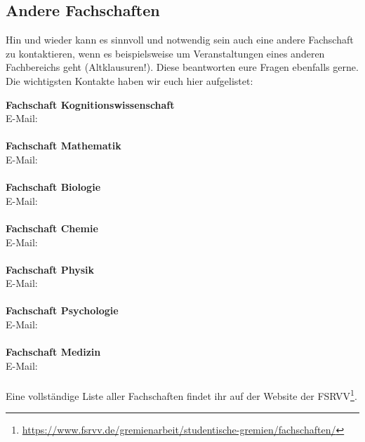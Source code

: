 

\vfill
\subsection{Andere Fachschaften}
Hin und wieder kann es sinnvoll und notwendig sein auch eine andere Fachschaft
zu kontaktieren, wenn es beispielsweise um Veranstaltungen eines anderen
Fachbereichs geht (Altklausuren!). Diese beantworten eure Fragen ebenfalls
gerne. Die wichtigsten Kontakte haben wir euch hier aufgelistet:

\textbf{Fachschaft Kognitionswissenschaft}\\
E-Mail: \\
\\
\textbf{Fachschaft Mathematik}\\
E-Mail: \\
\\
\textbf{Fachschaft Biologie}\\
E-Mail: \\
\\
\textbf{Fachschaft Chemie}\\
E-Mail: \\
\\
\textbf{Fachschaft Physik}\\
E-Mail: \\
\\
\textbf{Fachschaft Psychologie}\\
E-Mail: \\
\\
\textbf{Fachschaft Medizin}\\
E-Mail: \\
\\
Eine vollständige Liste aller Fachschaften findet ihr auf der Website der
FSRVV\footnote{\url{https://www.fsrvv.de/gremienarbeit/studentische-gremien/fachschaften/}}.

\vfill

